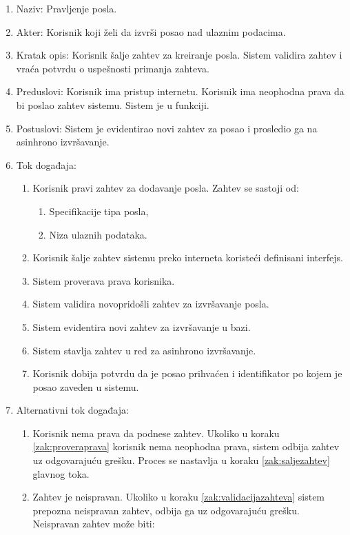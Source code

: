\documentclass[12pt,oneside]{memoir}
\begin{document}
\begin{enumerate}
\item Naziv: Pravljenje posla.
\item Akter: Korisnik koji želi da izvrši posao nad ulaznim podacima.
\item Kratak opis: Korisnik šalje zahtev za kreiranje posla. Sistem validira zahtev i vraća potvrdu o uspešnosti primanja zahteva.
\item Preduslovi: Korisnik ima pristup internetu. Korisnik ima neophodna prava da bi poslao zahtev sistemu. Sistem je u funkciji.
\item Postuslovi: Sistem je evidentirao novi zahtev za posao i prosledio ga na asinhrono izvršavanje.
\item Tok događaja:
	\begin{enumerate}
	\item \label{zak:pravizahtev}Korisnik pravi zahtev za dodavanje posla. Zahtev se sastoji od:
		\begin{enumerate}
		\item Specifikacije tipa posla,
		\item Niza ulaznih podataka.
		\end{enumerate}
	\item \label{zak:saljezahtev} Korisnik šalje zahtev sistemu preko interneta koristeći definisani interfejs.
	\item \label{zak:proveraprava} Sistem proverava prava korisnika.
	\item \label{zak:validacijazahteva} Sistem validira novopridošli zahtev za izvršavanje posla.
	\item Sistem evidentira novi zahtev za izvršavanje u bazi.
	\item \label{zak:asinhzakazivanje} Sistem stavlja zahtev u red za asinhrono izvršavanje.
	\item Korisnik dobija potvrdu da je posao prihvaćen i identifikator po kojem je posao zaveden u sistemu.
	\end{enumerate}
\item Alternativni tok događaja:
	\begin{enumerate}
	\item Korisnik nema prava da podnese zahtev. Ukoliko u koraku \ref{zak:proveraprava} korisnik nema neophodna prava, sistem odbija zahtev uz odgovarajuću grešku. Proces se nastavlja u koraku \ref{zak:saljezahtev} glavnog toka.
	\item Zahtev je neispravan. Ukoliko u koraku \ref{zak:validacijazahteva} sistem prepozna neispravan zahtev, odbija ga uz odgovarajuću grešku. Neispravan zahtev može biti:

\end{enumerate}
\end{enumerate}
\end{document}
